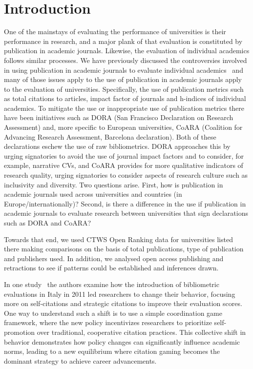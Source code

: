 \documentclass[amsfonts, amssymb, prl, superscriptaddress, notitlepage, twocolumn, nofootinbib]{revtex4-2}
\begin{document}
\maketitle 

\section{Introduction}
One of the mainstays of evaluating the performance of universities is their performance in research, and a major plank of that evaluation is constituted by publication in academic journals. Likewise, the evaluation of individual academics follows similar processes. 
We have previously discussed the controversies involved in using publication in academic journals to evaluate individual academics~\cite{watson2023assessing} and many of those issues apply to the use of publication in academic journals apply to the evaluation of universities. Specifically, the use of publication metrics such as total citations to articles, impact factor of journals and h-indices of individual academics. 
To mitigate the use or inappropriate use of publication metrics there have been initiatives such as DORA (San Francisco Declaration on Research Assessment) and, more specific to European universities, CoARA (Coalition for Advancing Research Assessment, Barcelona declaration). Both of these declarations eschew the use of raw bibliometrics. DORA approaches this by urging signatories to avoid the use of journal impact factors and to consider, for example, narrative CVs, and CoARA provides for more qualitative indicators of research quality, urging signatories to consider aspects of research culture such as inclusivity and diversity. 
Two questions arise. First, how is publication in academic journals used across universities and countries (in Europe/internationally)? Second, is there a difference in the use if publication in academic journals to evaluate research between universities that sign declarations such as DORA and CoARA? 

Towards that end, we used CTWS Open Ranking data for universities listed there making comparisons on the basis of total publications, type of publication and publishers used. In addition, we analysed open access publishing and retractions to see if patterns could be established and inferences drawn.

In one study~\cite{baccini2019citation} the authors examine how the introduction of bibliometric evaluations in Italy in 2011 led researchers to change their behavior, focusing more on self-citations and strategic citations to improve their evaluation scores. One way to understand such a shift is to use a simple coordination game framework, where the new policy incentivizes researchers to prioritize self-promotion over traditional, cooperative citation practices. This collective shift in behavior demonstrates how policy changes can significantly influence academic norms, leading to a new equilibrium where citation gaming becomes the dominant strategy to achieve career advancements.
\end{document}
